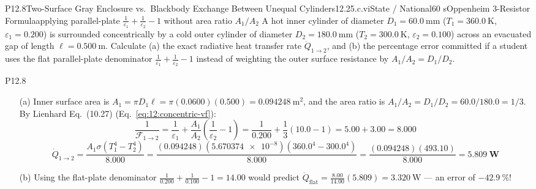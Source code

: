 \begin{problem}{P12.8}{Two-Surface Gray Enclosure vs.\ Blackbody Exchange Between Unequal Cylinders}{12.2}{5.c.vi}{State / National}{60 s}{Oppenheim 3-Resistor Formula}{applying parallel-plate $\frac{1}{\varepsilon_1}+\frac{1}{\varepsilon_2}-1$ without area ratio $A_1/A_2$}
A hot inner cylinder of diameter $D_1 = \SI{60.0}{\milli\meter}$ ($T_1 = \SI{360.0}{\kelvin}$, $\varepsilon_1 = 0.200$) is surrounded concentrically by a cold outer cylinder of diameter $D_2 = \SI{180.0}{\milli\meter}$ ($T_2 = \SI{300.0}{\kelvin}$, $\varepsilon_2 = 0.100$) across an evacuated gap of length $\ell = \SI{0.500}{\meter}$. Calculate (a) the exact radiative heat transfer rate $\dot{Q}_{1\to 2}$, and (b) the percentage error committed if a student uses the flat parallel-plate denominator $\frac{1}{\varepsilon_1} + \frac{1}{\varepsilon_2} - 1$ instead of weighting the outer surface resistance by $A_1/A_2 = D_1/D_2$.
\end{problem}
\begin{solution}{P12.8}
\begin{enumerate}
  \item[(a)] Inner surface area is $A_1 = \pi D_1 \ell = \pi(0.0600)(0.500) = \SI{0.094248}{\square\meter}$, and the area ratio is $A_1 / A_2 = D_1 / D_2 = 60.0 / 180.0 = 1/3$. By Lienhard Eq.~(10.27) (Eq.~\ref{eq:12:concentric-vf}):
  \[
    \frac{1}{\mathcal{F}_{1\to 2}} = \frac{1}{\varepsilon_1} + \frac{A_1}{A_2}\!\left(\frac{1}{\varepsilon_2} - 1\right) = \frac{1}{0.200} + \frac{1}{3}(10.0 - 1) = 5.00 + 3.00 = \mathbf{8.000}
  \]
  \[
    \dot{Q}_{1\to 2} = \frac{A_1 \sigma\left(T_1^4 - T_2^4\right)}{8.000} = \frac{(0.094248)(\num{5.670374e-8})\left(360.0^4 - 300.0^4\right)}{8.000} = \frac{(0.094248)(493.10)}{8.000} = \mathbf{\SI{5.809}{\watt}}
  \]
  \item[(b)] Using the flat-plate denominator $\frac{1}{0.200} + \frac{1}{0.100} - 1 = 14.00$ would predict $\dot{Q}_{\mathrm{flat}} = \frac{8.00}{14.00}(5.809) = \SI{3.320}{\watt}$ — an error of $\mathbf{-\SI{42.9}{\percent}}$!
\end{enumerate}
\end{solution}

